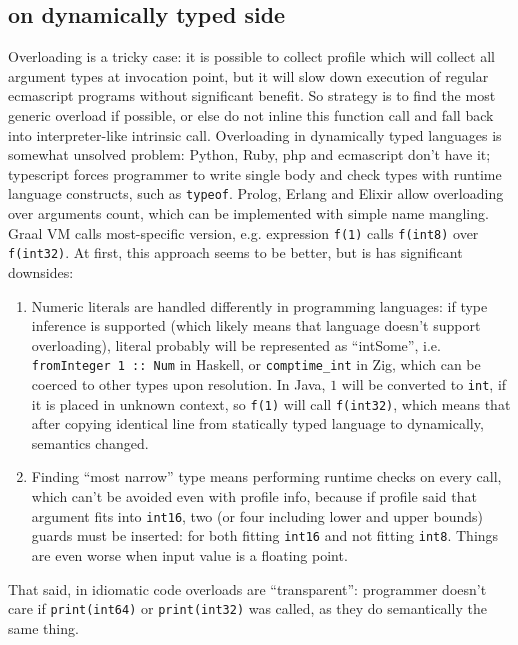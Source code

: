 \documentclass[times,specification,annotation]{itmo-student-thesis}
\begin{document}
\subsection{on dynamically typed side}
Overloading is a tricky case: it is possible to collect profile which will collect all argument types at invocation point, but it will slow down execution of regular ecmascript programs without significant benefit. So strategy is to find the most generic overload if possible, or else do not inline this function call and fall back into interpreter-like intrinsic call. Overloading in dynamically typed languages is somewhat unsolved problem: Python, Ruby, php and ecmascript don't have it; typescript forces programmer to write single body and check types with runtime language constructs, such as \texttt{typeof}. Prolog, Erlang and Elixir allow overloading over arguments count, which can be implemented with simple name mangling.\\
Graal VM calls most-specific version, e.g. expression \texttt{f(1)} calls \texttt{f(int8)} over \texttt{f(int32)}. At first, this approach seems to be better, but is has significant downsides:\\
\begin{enumerate}
	\item Numeric literals are handled differently in programming languages: if type inference is supported (which likely means that language doesn't support overloading), literal probably will be represented as ``intSome'', i.e. \texttt{fromInteger 1 :: Num} in Haskell, or \texttt{comptime\_int} in Zig, which can be coerced to other types upon resolution. In Java, $1$ will be converted to \texttt{int}, if it is placed in unknown context, so \texttt{f(1)} will call \texttt{f(int32)}, which means that after copying identical line from statically typed language to dynamically, semantics changed.
	\item Finding ``most narrow'' type means performing runtime checks on every call, which can't be avoided even with profile info, because if profile said that argument fits into \texttt{int16}, two (or four including lower and upper bounds) guards must be inserted: for both fitting \texttt{int16} and not fitting \texttt{int8}. Things are even worse when input value is a floating point.
\end{enumerate}
That said, in idiomatic code overloads are ``transparent'': programmer doesn't care if \texttt{print(int64)} or \texttt{print(int32)} was called, as they do semantically the same thing.
\end{document}
